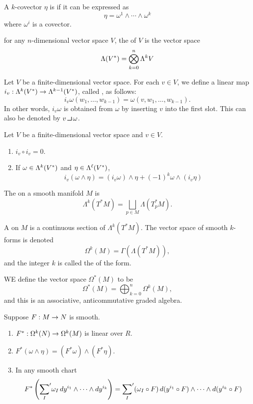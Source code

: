 \dfn A $k$-covector $\eta$ is  if it can be expressed as
\[\eta = \omega^1\wedge \cdots\wedge \omega^k\]
where $\omega^i$ is a covector.

\dfn for any $n$-dimensional vector space $V$, the  of $V$ is the vector space
\[\Lambda(V^*) = \bigotimes_{k = 0}^n \Lambda^k V\]


\dfn Let $V$ be a finite-dimensional vector space. For each $v\in V$, we define a linear map $i_v:\Lambda^k(V^*)\rightarrow\Lambda^{k - 1}(V^*)$, called , as follows:
\[i_v\omega(w_1,\ldots,w_{k - 1}) = \omega(v,w_1,\ldots,w_{k - 1}).\]
In other words, $i_v\omega$ is obtained from $\omega$ by inserting $v$ into the first slot. This can also be denoted by $v\hook \omega$.

\setcounter{thm}{12}

\begin{lem}
Let $V$ be a finite-dimensional vector space and $v\in V$.
\begin{enumerate}
    \item $i_v\circ i_v = 0$.
    \item If $\omega\in \Lambda^k(V^*)$ and $\eta\in \Lambda^\ell(V^*)$,
    \[i_v(\omega\wedge\eta) = (i_v\omega)\wedge\eta + (-1)^k\omega\wedge(i_v\eta)\]
\end{enumerate}
\end{lem}

\dfn The  on a smooth manifold $M$ is
\[\Lambda^k(T^*M) = \bigsqcup_{p\in M} \Lambda(T^*_pM).\]


\dfn A  on $M$ is a continuous section of $\Lambda^k(T^*M)$. The vector space of smooth $k$-forms is denoted
\[\Omega^k(M) = \Gamma(\Lambda(T^*M)),\]
and the integer $k$ is called the  of the form.

\dfn WE define the vector space $\Omega^*(M)$ to be
\[\Omega^*(M) = \bigoplus_{k = 0}^n \Omega^k(M),\]
and this is an associative, anticommutative graded algebra.


\setcounter{thm}{15}

\begin{lem}
Suppose $F:M\rightarrow N$ is smooth.
\begin{enumerate}
    \item $F^*:\Omega^k(N)\rightarrow \Omega^k(M)$ is linear over $R$.
    \item $F^*(\omega\wedge\eta) = (F^*\omega)\wedge(F^*\eta)$.
    \item In any smooth chart
    \[F^*\left({\sum_I}^\prime\omega_I\,dy^{i_1}\wedge\cdots\wedge dy^{i_k}\right) = {\sum_I}^\prime(\omega_I\circ F)\,d(y^{i_1}\circ F)\wedge\cdots\wedge d(y^{i_k}\circ F)\]
\end{enumerate}
\end{lem}

